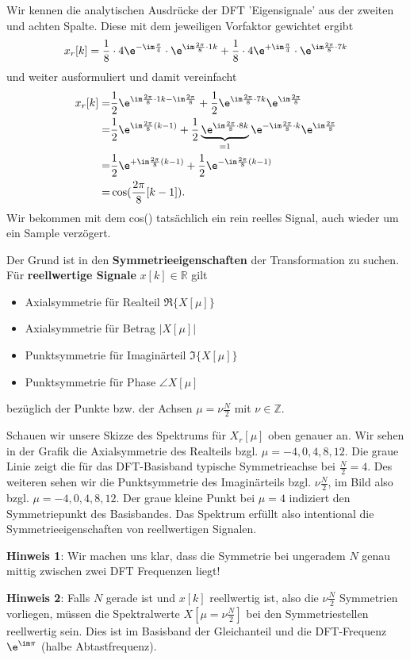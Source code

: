 \begin{ExCalc}
Wir kennen die analytischen Ausdrücke der DFT 'Eigensignale' aus der zweiten
und achten Spalte. Diese mit dem jeweiligen Vorfaktor gewichtet ergibt
\begin{align}
x_r[k]
=
\frac{1}{8} \cdot 4 \e^{-\im\frac{\pi}{4}} \cdot  \e^{\im \frac{2\pi}{8}\cdot 1 k}+
\frac{1}{8} \cdot 4 \e^{+\im\frac{\pi}{4}} \cdot  \e^{\im \frac{2\pi}{8}\cdot 7 k}
\end{align}
%
und weiter ausformuliert und damit vereinfacht
\begin{align}
x_r[k]
=
&\frac{1}{2} \e^{\im \frac{2\pi}{8}\cdot 1 k - \im\frac{2\pi}{8}}+
\frac{1}{2} \e^{\im \frac{2\pi}{8}\cdot 7 k} \e^{\im\frac{2\pi}{8}}\\
=
&\frac{1}{2} \e^{\im \frac{2\pi}{8} (k-1)}+
\frac{1}{2} \underbrace{\e^{\im \frac{2\pi}{8}\cdot 8 k}}_{=1} \e^{- \im \frac{2\pi}{8}\cdot k} \e^{\im\frac{2\pi}{8}}\\
=
&\frac{1}{2} \e^{+\im \frac{2\pi}{8} (k-1)}+
\frac{1}{2} \e^{-\im \frac{2\pi}{8} (k-1)}\\
=
&\cos(\frac{2\pi}{8} [k-1]).
\end{align}
Wir bekommen mit dem cos() tatsächlich ein rein reelles Signal, auch wieder
um ein Sample verzögert.

Der Grund ist in den \textbf{Symmetrieeigenschaften} der Transformation zu
suchen. Für \textbf{reellwertige Signale} $x[k]\in\mathbb{R}$ gilt
\begin{itemize}
  \item Axialsymmetrie für Realteil $\Re\{X[\mu]\}$
  \item Axialsymmetrie für Betrag $|X[\mu]|$
  \item Punktsymmetrie für Imaginärteil $\Im\{X[\mu]\}$
  \item Punktsymmetrie für Phase $\angle X[\mu]$
\end{itemize}
bezüglich der Punkte bzw. der Achsen $\mu = \nu \frac{N}{2}$ mit $\nu\in\mathbb{Z}$.

Schauen wir unsere Skizze des Spektrums für $X_r[\mu]$ oben genauer an.
Wir sehen in der Grafik die Axialsymmetrie des Realteils
bzgl. $\mu=-4,0,4,8,12$. Die graue
Linie zeigt die für das DFT-Basisband typische Symmetrieachse bei $\frac{N}{2}=4$.
Des weiteren sehen wir die Punktsymmetrie des Imaginärteils bzgl. $\nu \frac{N}{2}$,
im Bild also bzgl. $\mu=-4,0,4,8,12$. Der graue kleine Punkt bei $\mu=4$ indiziert
den Symmetriepunkt des Basisbandes.
Das Spektrum erfüllt also intentional
die Symmetrieeigenschaften von reellwertigen Signalen.

\textbf{Hinweis 1}: Wir machen uns klar, dass die Symmetrie bei ungeradem $N$
genau mittig zwischen zwei DFT Frequenzen liegt!

\textbf{Hinweis 2}:
Falls $N$ gerade ist und $x[k]$ reellwertig ist, also die $\nu \frac{N}{2}$
Symmetrien vorliegen, müssen die Spektralwerte $X[\mu = \nu \frac{N}{2}]$
bei den Symmetriestellen reellwertig sein.
Dies ist im Basisband der Gleichanteil und die DFT-Frequenz
$\e^{\im\pi}$ (halbe Abtastfrequenz).
\end{ExCalc}





